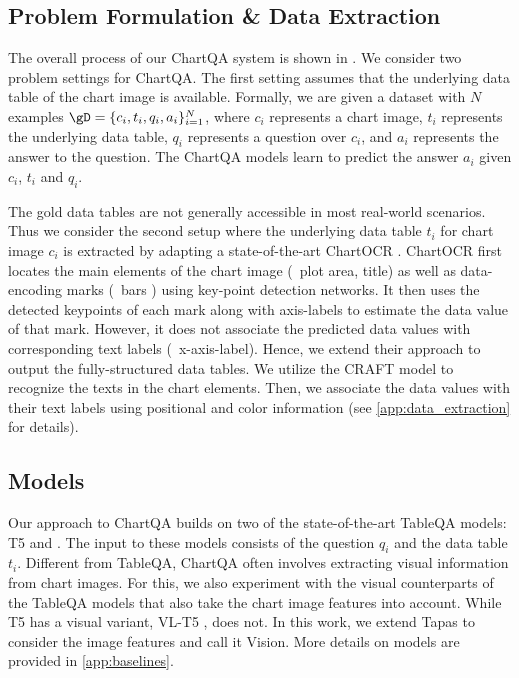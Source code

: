 




\subsection{Problem Formulation \& Data Extraction}
\label{sec:problem-extraction}
The overall process of our ChartQA system is shown in . We consider two problem settings for ChartQA. The first setting assumes that the underlying data table of the chart image is available. Formally, we are given a dataset with $N$ examples $\gD = \{c_i, t_i, q_i, a_i\}_{i=1}^N$, where $c_i$ represents a chart image, $t_i$ represents the underlying data table, $q_i$ represents a question over $c_i$, and $a_i$ represents the answer to the question. The ChartQA models learn to predict the answer $a_i$ given $c_i$, $t_i$ and $q_i$. 

The gold data tables are not generally accessible in most real-world scenarios. Thus we consider the second setup where the underlying data table $t_i$ for chart image $c_i$ is extracted by adapting a state-of-the-art ChartOCR \cite{ChartOCR}. ChartOCR first  locates the main elements of the chart image (\eg\ plot area, title) as well as data-encoding marks (\eg\ bars
) using key-point detection networks. It then uses the detected keypoints of each mark along with  axis-labels to estimate the data value of that mark. However, 
it does not associate the predicted data values with corresponding text labels (\eg\ x-axis-label).
 Hence, we extend their approach to output the fully-structured data tables. We utilize the CRAFT \cite{craftrecognition} model to recognize the texts in the chart elements. Then, we associate the data values with their text labels using positional and color information (see \ref{app:data_extraction} for details). 



  





\subsection{Models} \label{subsec:data2text}

Our approach to ChartQA builds on two of the state-of-the-art TableQA models: T5 \cite{Raffel2020t5,nan2021feta} and {} \cite{tapas}. The input to these models consists of the question $q_i$ and the data table $t_i$. Different from TableQA, ChartQA often involves extracting visual information from chart images. For this, we also experiment with the visual counterparts of the TableQA models that also take the chart image features into account. While T5 has a visual variant, VL-T5 \cite{vlt5}, {} does not. In this work, we extend Tapas to consider the image features and call it Vision{}. More details on models 
are provided in \ref{app:baselines}.



